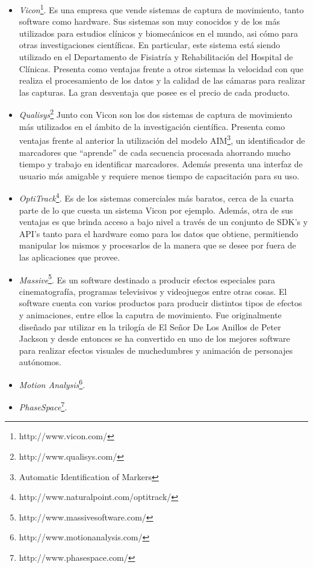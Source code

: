 \begin{itemize}
\item \emph{Vicon}\footnote{http://www.vicon.com/}. Es una empresa que vende sistemas de captura de movimiento, tanto software como hardware. Sus sistemas son muy conocidos y de los más utilizados para estudios clínicos y biomecánicos en el mundo, asi cómo para otras investigaciones científicas. En particular, este sistema está siendo utilizado en el Departamento de Fisiatría y Rehabilitación del Hospital de Clínicas. Presenta como ventajas frente a otros sistemas la velocidad con que realiza el procesamiento de los datos y la calidad de las cámaras para realizar las capturas. La gran desventaja que posee es el precio de cada producto.
\item \emph{Qualisys}\footnote{http://www.qualisys.com/} Junto con Vicon son los dos sistemas de captura de movimiento más utilizados en el ámbito de la investigación científica. Presenta como ventajas frente al anterior la utilización del modelo AIM\footnote{Automatic Identification of Markers}, un identificador de marcadores que ``aprende'' de cada secuencia procesada ahorrando mucho tiempo y trabajo en identificar marcadores. Además presenta una interfaz de usuario más amigable y requiere menos tiempo de capacitación para su uso.
\item \emph{OptiTrack}\footnote{http://www.naturalpoint.com/optitrack/}. Es de los sistemas comerciales más baratos, cerca de la cuarta parte de lo que cuesta un sistema Vicon por ejemplo. Además, otra de sus ventajas es que brinda acceso a bajo nivel a través de un conjunto de  SDK's y API's tanto para el hardware como para los datos que obtiene, permitiendo manipular los mismos y procesarlos de la manera que se desee por fuera de las aplicaciones que provee. 
\item \emph{Massive}\footnote{http://www.massivesoftware.com/}. Es un software destinado a producir efectos especiales para cinematografía, programas televisivos y videojuegos entre otras cosas. El software cuenta con varios productos para producir distintos tipos de efectos y animaciones, entre ellos la caputra de movimiento. Fue originalmente diseñado par utilizar en la trilogía de El Señor De Los Anillos de Peter Jackson y desde entonces se ha convertido en uno de los mejores software para realizar efectos visuales de muchedumbres y animación de personajes autónomos.
\item \emph{Motion Analysis}\footnote{http://www.motionanalysis.com/}.
\item \emph{PhaseSpace}\footnote{http://www.phasespace.com/}.
\end{itemize}

